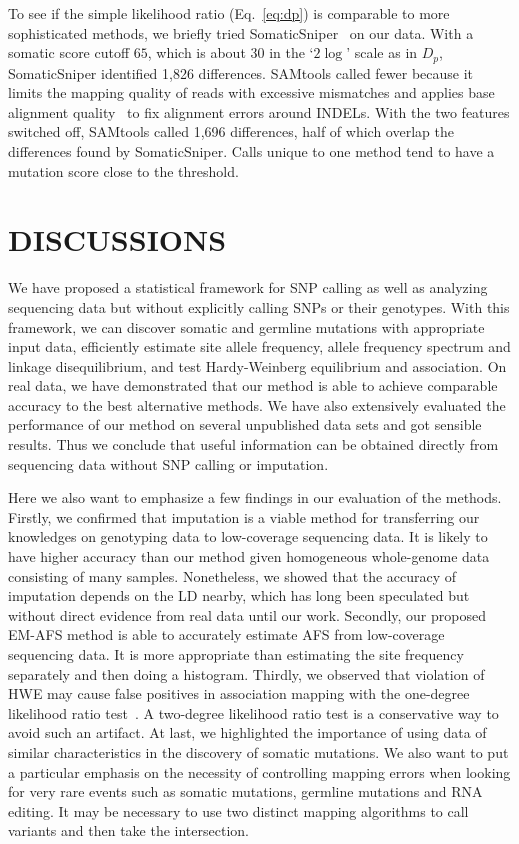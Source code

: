 \documentclass{bioinfo}
\begin{document}
To see if the simple likelihood ratio (Eq.~\ref{eq:dp}) is comparable to more
sophisticated methods, we briefly tried SomaticSniper~\citep{Larson:2011xx} on
our data.  With a somatic score cutoff $65$, which is about $30$ in the
`$2\log$' scale as in $D_p$, SomaticSniper identified 1,826 differences.
SAMtools called fewer because it limits the mapping quality of reads with
excessive mismatches and applies base alignment quality~\citep{Li:2011kx} to
fix alignment errors around INDELs. With the two features switched off,
SAMtools called 1,696 differences, half of which overlap the differences found
by SomaticSniper. Calls unique to one method tend to have a mutation score close
to the threshold.

\section{DISCUSSIONS}

We have proposed a statistical framework for SNP calling as well as analyzing
sequencing data but without explicitly calling SNPs or their genotypes. With
this framework, we can discover somatic and germline mutations with appropriate
input data, efficiently estimate site allele frequency, allele
frequency spectrum and linkage disequilibrium, and test Hardy-Weinberg
equilibrium and association. On real data, we have demonstrated that our method
is able to achieve comparable accuracy to the best alternative methods.  We
have also extensively evaluated the performance of our method on several
unpublished data sets and got sensible results. Thus we conclude that useful
information can be obtained directly from sequencing data without SNP calling
or imputation.

Here we also want to emphasize a few findings in our evaluation of the methods.
Firstly, we confirmed that imputation is a viable method for transferring our
knowledges on genotyping data to low-coverage sequencing data.  It is likely to
have higher accuracy than our method given homogeneous whole-genome data
consisting of many samples. Nonetheless, we showed that the accuracy of
imputation depends on the LD nearby, which has long been speculated but without
direct evidence from real data until our work. Secondly, our proposed EM-AFS
method is able to accurately estimate AFS from low-coverage sequencing data. It
is more appropriate than estimating the site frequency separately and then
doing a histogram.  Thirdly, we observed that violation of HWE may cause false
positives in association mapping with the one-degree likelihood ratio
test~\citep{Kim:2011fk}. A two-degree likelihood ratio test is a conservative
way to avoid such an artifact. At last, we highlighted the importance of using
data of similar characteristics in the discovery of somatic mutations. We also
want to put a particular emphasis on the necessity of controlling mapping
errors when looking for very rare events such as somatic mutations, germline
mutations and RNA editing. It may be necessary to use two distinct mapping
algorithms to call variants and then take the intersection.
\end{document}
